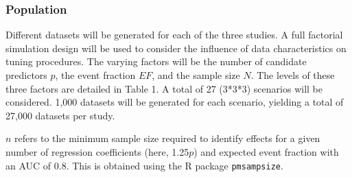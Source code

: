 \documentclass{article}
\begin{document}
\subsubsection{Population}

Different datasets will be generated for each of the three studies. A full factorial simulation design will be used to consider the influence of data characteristics on tuning procedures. The varying factors will be the number of candidate predictors $p$, the event fraction $EF$, and the sample size $N$. The levels of these three factors are detailed in Table 1. A total of 27 (3*3*3) scenarios will be considered. 1,000 datasets will be generated for each scenario, yielding a total of 27,000 datasets per study.

\begin{table}
    \label{tab:scenarios}
    \begin{tablenotes}
      \small
      \item $n$ refers to the minimum sample size required to identify effects for a given number of regression coefficients (here, 1.25$p$) and expected event fraction \cite{riley_calculating_2020} with an AUC of 0.8. This is obtained using the R package \texttt{pmsampsize}.
    \end{tablenotes}
\end{table}
\end{document}
